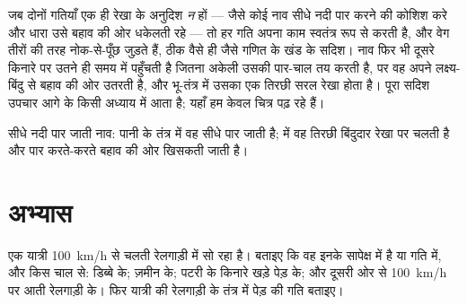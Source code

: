 \begin{remark}[एक साथ दो दिशाएँ]\label{rem:g10:relative-motion:twodim}
जब दोनों गतियाँ एक ही रेखा के अनुदिश \emph{न} हों --- जैसे कोई नाव सीधे
नदी पार करने की कोशिश करे और धारा उसे बहाव की ओर धकेलती रहे --- तो हर
गति अपना काम स्वतंत्र रूप से करती है, और वेग तीरों की तरह नोक-से-पूँछ
जुड़ते हैं, ठीक वैसे ही जैसे गणित के खंड के सदिश। नाव फिर भी दूसरे किनारे
पर उतने ही समय में पहुँचती है जितना अकेली उसकी पार-चाल तय करती है, पर वह
अपने लक्ष्य-बिंदु से बहाव की ओर उतरती है, और भू-तंत्र में उसका
 एक तिरछी सरल रेखा होता है। पूरा सदिश उपचार आगे के किसी
अध्याय में आता है; यहाँ हम केवल चित्र पढ़ रहे हैं।
\end{remark}

\begin{omfigure}

{\small सीधे नदी पार जाती नाव: पानी के तंत्र में वह सीधे पार जाती है;
 में वह तिरछी बिंदुदार रेखा पर चलती है और पार
करते-करते बहाव की ओर खिसकती जाती है।}
\end{omfigure}

\section{अभ्यास}

\begin{exercise}[$\star$]\label{exo:g10:relative-motion:1}
एक यात्री \qty{100}{km/h} से चलती रेलगाड़ी में सो रहा है। बताइए कि वह इनके
सापेक्ष  में है या गति में, और किस चाल से: डिब्बे के; ज़मीन
के; पटरी के किनारे खड़े पेड़ के; और दूसरी ओर से \qty{100}{km/h} पर आती रेलगाड़ी
के। फिर यात्री की रेलगाड़ी के तंत्र में पेड़ की गति बताइए।
\end{exercise}


